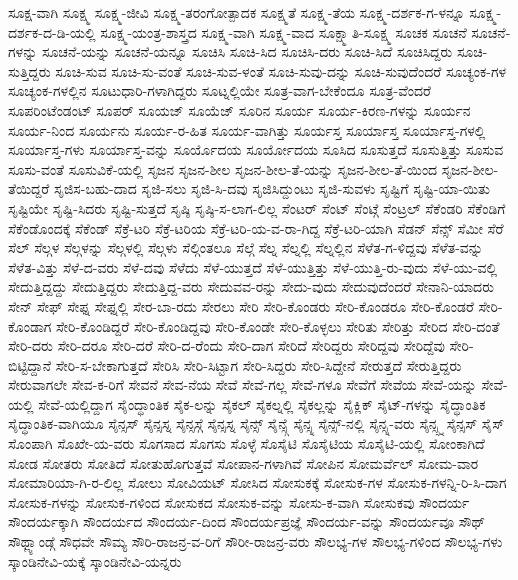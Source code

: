 {ಸೂಕ್ಷ-ವಾಗಿ
ಸೂಕ್ಷ್ಮ
ಸೂಕ್ಷ್ಮ-ಜೀವಿ
ಸೂಕ್ಷ್ಮ-ತರಂಗೋತ್ಪಾದಕ
ಸೂಕ್ಷ್ಮತೆ
ಸೂಕ್ಷ್ಮ-ತೆಯ
ಸೂಕ್ಷ್ಮ-ದರ್ಶಕ-ಗ-ಳನ್ನೂ
ಸೂಕ್ಷ್ಮ-ದರ್ಶಕ-ದ-ಡಿ-ಯಲ್ಲಿ
ಸೂಕ್ಷ್ಮ-ಯಂತ್ರ-ಶಾಸ್ತ್ರದ
ಸೂಕ್ಷ್ಮ-ವಾಗಿ
ಸೂಕ್ಷ್ಮ-ವಾದ
ಸೂಕ್ಷ್ಮಾತಿ-ಸೂಕ್ಷ್ಮ
ಸೂಚಕ
ಸೂಚನೆ
ಸೂಚನೆ-ಗಳನ್ನು
ಸೂಚನೆ-ಯನ್ನು
ಸೂಚನೆ-ಯನ್ನೂ
ಸೂಚಿಸಿ
ಸೂಚಿ-ಸಿದ
ಸೂಚಿಸಿ-ದರು
ಸೂಚಿ-ಸಿದೆ
ಸೂಚಿಸಿದ್ದರು
ಸೂಚಿ-ಸುತ್ತಿದ್ದರು
ಸೂಚಿ-ಸುವ
ಸೂಚಿ-ಸು-ವಂತೆ
ಸೂಚಿ-ಸುವ-ಳಂತೆ
ಸೂಚಿ-ಸುವು-ದನ್ನು
ಸೂಚಿ-ಸುವುದೆಂದರೆ
ಸೂಚ್ಯಂಕ-ಗಳ
ಸೂಚ್ಯಂಕ-ಗಳಲ್ಲಿನ
ಸೂಟುಧಾರಿ-ಗಳಾಗಿದ್ದರು
ಸೂಟ್ನಲ್ಲಿಯೇ
ಸೂತ್ರ-ವಾಗ-ಬೇಕೆಂದೂ
ಸೂತ್ರ-ವೆಂದರೆ
ಸೂಪರಿಂಟೆಂಡಂಟ್
ಸೂಪರ್
ಸೂಯಜ್
ಸೂಯೆಜ್
ಸೂರಿನ
ಸೂರ್ಯ
ಸೂರ್ಯ-ಕಿರಣ-ಗಳನ್ನು
ಸೂರ್ಯನ
ಸೂರ್ಯ-ನಿಂದ
ಸೂರ್ಯನು
ಸೂರ್ಯ-ರ-ಹಿತ
ಸೂರ್ಯ-ವಾಗಿತ್ತು
ಸೂರ್ಯಸ್ತ
ಸೂರ್ಯಾಸ್ತ
ಸೂರ್ಯಾಸ್ತ-ಗಳಲ್ಲಿ
ಸೂರ್ಯಾಸ್ತ-ಗಳು
ಸೂರ್ಯಾಸ್ತ-ವನ್ನು
ಸೂರ್ಯೊದಯ
ಸೂರ್ಯೋದಯ
ಸೂಸಿದ
ಸೂಸುತ್ತದೆ
ಸೂಸುತ್ತಿತ್ತು
ಸೂಸುವ
ಸೂಸು-ವಂತೆ
ಸೂಸುವಿಕೆ-ಯಲ್ಲಿ
ಸೃಜನ
ಸೃಜನ-ಶೀಲ
ಸೃಜನ-ಶೀಲ-ತೆ-ಯನ್ನು
ಸೃಜನ-ಶೀಲ-ತೆ-ಯಿಂದ
ಸೃಜನ-ಶೀಲ-ತೆಯಿದ್ದರೆ
ಸೃಜಿಸ-ಬಹು-ದಾದ
ಸೃಜಿ-ಸಲು
ಸೃಜಿ-ಸಿ-ದವು
ಸೃಜಿಸಿದ್ದುಂಟು
ಸೃಜಿ-ಸುವಳು
ಸೃಷ್ಟಿಗೆ
ಸೃಷ್ಟಿ-ಯಾ-ಯಿತು
ಸೃಷ್ಟಿಯೇ
ಸೃಷ್ಟಿ-ಸಿದರು
ಸೃಷ್ಟಿ-ಸುತ್ತದೆ
ಸೃಷ್ಠಿ
ಸೃಷ್ಠಿ-ಸ-ಲಾಗ-ಲಿಲ್ಲ
ಸೆಂಟರ್
ಸೆಂಟ್
ಸೆಂಟ್ಗೆ
ಸೆಂಟ್ರಲ್
ಸೆಕೆಂಡರಿ
ಸೆಕೆಂಡಿಗೆ
ಸೆಕೆಂಡೊಂದಕ್ಕೆ
ಸೆಕೆಂಡ್
ಸೆಕ್ರೆ-ಟರಿ
ಸೆಕ್ರೆ-ಟರಿಯ
ಸೆಕ್ರೆ-ಟರಿ-ಯ-ವ-ರಾ-ಗಿದ್ದ
ಸೆಕ್ರೆ-ಟರಿ-ಯಾಗಿ
ಸೆಡನ್
ಸೆನ್ಸ್
ಸೆಮೀ
ಸೆರೆ
ಸೆಲ್
ಸೆಲ್ಗಳ
ಸೆಲ್ಗಳನ್ನು
ಸೆಲ್ಗಳಲ್ಲಿ
ಸೆಲ್ಗಳು
ಸೆಲ್ಗಿಂತಲೂ
ಸೆಲ್ಗೆ
ಸೆಲ್ನ
ಸೆಲ್ನಲ್ಲಿ
ಸೆಲ್ನಲ್ಲಿನ
ಸೆಳೆತ-ಗ-ಳಿದ್ದವು
ಸೆಳೆತ-ವನ್ನು
ಸೆಳೆತ-ವಿತ್ತು
ಸೆಳೆ-ದ-ವರು
ಸೆಳೆ-ದವು
ಸೆಳೆದು
ಸೆಳೆ-ಯುತ್ತದೆ
ಸೆಳೆ-ಯುತ್ತಿತ್ತು
ಸೆಳೆ-ಯುತ್ತಿ-ರು-ವುದು
ಸೆಳೆ-ಯು-ವಲ್ಲಿ
ಸೇದುತ್ತಿದ್ದದ್ದು
ಸೇದುತ್ತಿದ್ದರು
ಸೇದುತ್ತಿದ್ದ-ವರು
ಸೇದುವವ-ರನ್ನು
ಸೇದು-ವುದು
ಸೇದುವುದೆಂದರೆ
ಸೇನಾನಿ-ಯಾದರು
ಸೇನ್
ಸೇಫ್
ಸೇಫ್ನ
ಸೇಫ್ನಲ್ಲಿ
ಸೇರ-ಬಾ-ರದು
ಸೇರಲು
ಸೇರಿ
ಸೇರಿ-ಕೊಂಡರು
ಸೇರಿ-ಕೊಂಡರೂ
ಸೇರಿ-ಕೊಂಡರೆ
ಸೇರಿ-ಕೊಂಡಾಗ
ಸೇರಿ-ಕೊಂಡಿದ್ದರೆ
ಸೇರಿ-ಕೊಂಡಿದ್ದವು
ಸೇರಿ-ಕೊಂಡೇ
ಸೇರಿ-ಕೊಳ್ಳಲು
ಸೇರಿತು
ಸೇರಿತ್ತು
ಸೇರಿದ
ಸೇರಿ-ದಂತೆ
ಸೇರಿ-ದರು
ಸೇರಿ-ದರೂ
ಸೇರಿ-ದರೆ
ಸೇರಿ-ದ-ರೆಂದು
ಸೇರಿ-ದಾಗ
ಸೇರಿದೆ
ಸೇರಿದ್ದರು
ಸೇರಿದ್ದವು
ಸೇರಿದ್ದೆವು
ಸೇರಿ-ಬಿಟ್ಟಿದ್ದಾನೆ
ಸೇರಿ-ಸ-ಬೇಕಾಗುತ್ತದೆ
ಸೇರಿಸಿ
ಸೇರಿ-ಸಿಟ್ಟಾಗ
ಸೇರಿ-ಸಿದ್ದರು
ಸೇರಿ-ಸಿದ್ದೇನೆ
ಸೇರುತ್ತದೆ
ಸೇರುತ್ತಿದ್ದರು
ಸೇರುವಾಗಲೇ
ಸೇವ-ಕ-ರಿಗೆ
ಸೇವನೆ
ಸೇವ-ನೆಯ
ಸೇವೆ
ಸೇವೆ-ಗಲ್ಲ
ಸೇವೆ-ಗಳೂ
ಸೇವೆಗೆ
ಸೇವೆಯ
ಸೇವೆ-ಯನ್ನು
ಸೇವೆ-ಯಲ್ಲಿ
ಸೇವೆ-ಯಲ್ಲಿದ್ದಾಗ
ಸೈಂದ್ಧಾಂತಿಕ
ಸೈಕ-ಲನ್ನು
ಸೈಕಲ್
ಸೈಕಲ್ನಲ್ಲಿ
ಸೈಕಲ್ಲನ್ನು
ಸೈಕ್ಲಿಕ್
ಸೈಟ್-ಗಳನ್ನು
ಸೈದ್ಧಾಂತಿಕ
ಸೈದ್ಧಾಂತಿಕ-ವಾಗಿಯೂ
ಸೈನ್ಸಸ್
ಸೈನ್ಸಸ್ನ
ಸೈನ್ಸಸ್ಗೆ
ಸೈನ್ಸಸ್ನ
ಸೈನ್ಸ್
ಸೈನ್ಸ್ಗೆ
ಸೈನ್ಸ್ನ
ಸೈನ್ಸ್-ನಲ್ಲಿ
ಸೈನ್ಸ್ನ-ವರು
ಸೈನ್ಸ್ಸ್ನ
ಸೈನ್ಸಸ್
ಸೈಸ್
ಸೊಂಪಾಗಿ
ಸೊಖೇ-ಯ-ವರು
ಸೊಗಸಾದ
ಸೊಗಸು
ಸೊಳ್ಳೆ
ಸೊಸೈಟಿ
ಸೊಸೈಟಿಯ
ಸೊಸೈಟಿ-ಯಲ್ಲಿ
ಸೋಂಕಾಗಿದೆ
ಸೋಡ
ಸೋತರು
ಸೋತಿದೆ
ಸೋತುಹೊಗುತ್ತವೆ
ಸೋಪಾನ-ಗಳಾಗಿವೆ
ಸೋಪಿನ
ಸೋಮರ್ವೆಲ್
ಸೋಮ-ವಾರ
ಸೋಮಾರಿಯಾ-ಗಿ-ರ-ಲಿಲ್ಲ
ಸೋಲು
ಸೋವಿಯಟ್
ಸೋಸಿದ
ಸೋಸುಕಕ್ಕೆ
ಸೋಸುಕ-ಗಳ
ಸೋಸುಕ-ಗಳನ್ನಿ-ರಿ-ಸಿ-ದಾಗ
ಸೋಸುಕ-ಗಳನ್ನು
ಸೋಸುಕ-ಗಳಿಂದ
ಸೋಸುಕದ
ಸೋಸುಕ-ವನ್ನು
ಸೋಸು-ಕ-ವಾಗಿ
ಸೋಸುಕವು
ಸೌಂದರ್ಯ
ಸೌಂದರ್ಯಕ್ಕಾಗಿ
ಸೌಂದರ್ಯದ
ಸೌಂದರ್ಯ-ದಿಂದ
ಸೌಂದರ್ಯಪ್ರಜ್ಞೆ
ಸೌಂದರ್ಯ-ವನ್ನು
ಸೌಂದರ್ಯವೂ
ಸೌಥ್
ಸೌಥ್ಲ್ಯಾಂಡ್ಗೆ
ಸೌಧವೇ
ಸೌಮ್ಯ
ಸೌರಿ-ರಾಜನ್ರ-ವ-ರಿಗೆ
ಸೌರೀ-ರಾಜನ್ರ-ವರು
ಸೌಲಭ್ಯ-ಗಳ
ಸೌಲಭ್ಯ-ಗಳಿಂದ
ಸೌಲಭ್ಯ-ಗಳು
ಸ್ಕಾಂಡಿನೇವಿ-ಯಕ್ಕೆ
ಸ್ಕಾಂಡಿನೇವಿ-ಯನ್ನರು
}
